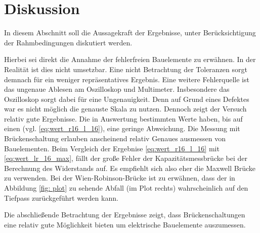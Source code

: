 \section{Diskussion}
In diesem Abschnitt soll die Aussagekraft der Ergebnisse, unter Berücksichtigung der  %
Rahmbedingungen diskutiert werden. %

Hierbei sei direkt die Annahme der fehlerfreien Bauelemente zu erwähnen.
In der Realität ist dies nicht umsetzbar.
Eine nicht Betrachtung der Toleranzen sorgt demnach für ein
weniger repräsentatives Ergebnis.
Eine weitere Fehlerquelle ist das ungenaue Ablesen am Oszilloskop und Multimeter.
Insbesondere das Oszilloskop sorgt dabei für eine Ungenauigkeit.
Denn auf Grund eines Defektes war es nicht möglich die genauste Skala zu nutzen.
Dennoch zeigt der Versuch relativ gute Ergebnisse.
Die in Auswertung bestimmten Werte haben, bis auf einen (vgl. \eqref{eq:wert_r16_l_16}), eine geringe Abweichung. %
Die Messung mit Brückenschaltung erlauben anscheinend relativ Genaues ausmessen von Bauelementen. %
Beim Vergleich der Ergebnise \eqref{eq:wert_r16_l_16} mit \eqref{eq:wert_lr_16_max}, %
fällt der große Fehler der Kapazitätsmessbrücke bei der Berechnung des Widerstands
auf. Es empfiehlt sich also eher die Maxwell Brücke zu verwenden. %
Bei der Wien-Robinson-Brücke ist zu erwähnen, dass der in Abbildung \ref{fig: plot}
zu sehende Abfall (im Plot rechts) wahrscheinlich auf den Tiefpass zurückgeführt werden
kann.

Die abschließende Betrachtung der Ergebnisse zeigt,
dass Brückenschaltungen eine relativ gute Möglichkeit bieten um elektrische Bauelemente %
auszumessen.
